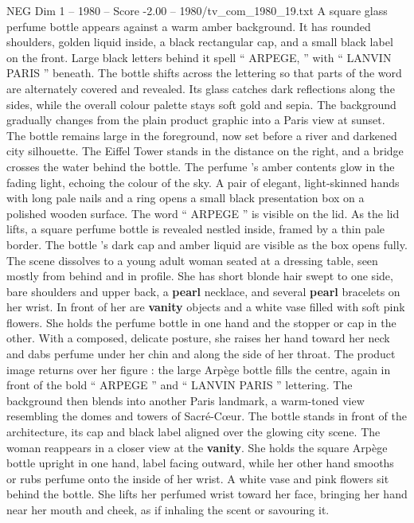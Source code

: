 \begin{textsample}{NEG Dim 1 – 1980 – Score -2.00 – 1980/tv\_com\_1980\_19.txt}  \label{ex:f1_neg_045}
A square glass perfume bottle appears against a warm amber background.
It has rounded shoulders, golden liquid inside, a black rectangular cap, and a small black label on the front.
Large black letters behind it spell “ ARPEGE, ” with “ LANVIN PARIS ” beneath.
The bottle shifts across the lettering so that parts of the word are alternately covered and revealed.
Its glass catches dark reflections along the sides, while the overall colour palette stays soft gold and sepia.
The background gradually changes from the plain product graphic into a Paris view at sunset.
The bottle remains large in the foreground, now set before a river and darkened city silhouette.
The Eiffel Tower stands in the distance on the right, and a bridge crosses the water behind the bottle.
The perfume ’s amber contents glow in the fading light, echoing the colour of the sky.
A pair of elegant, light-skinned hands with long pale nails and a ring opens a small black presentation box on a polished wooden surface.
The word “ ARPEGE ” is visible on the lid.
As the lid lifts, a square perfume bottle is revealed nestled inside, framed by a thin pale border.
The bottle ’s dark cap and amber liquid are visible as the box opens fully.
The scene dissolves to a young adult woman seated at a dressing table, seen mostly from behind and in profile.
She has short blonde hair swept to one side, bare shoulders and upper back, a \textbf{pearl} necklace, and several \textbf{pearl} bracelets on her wrist.
In front of her are \textbf{vanity} objects and a white vase filled with soft pink flowers.
She holds the perfume bottle in one hand and the stopper or cap in the other.
With a composed, delicate posture, she raises her hand toward her neck and dabs perfume under her chin and along the side of her throat.
The product image returns over her figure : the large Arpège bottle fills the centre, again in front of the bold “ ARPEGE ” and “ LANVIN PARIS ” lettering.
The background then blends into another Paris landmark, a warm-toned view resembling the domes and towers of Sacré-Cœur.
The bottle stands in front of the architecture, its cap and black label aligned over the glowing city scene.
The woman reappears in a closer view at the \textbf{vanity}.
She holds the square Arpège bottle upright in one hand, label facing outward, while her other hand smooths or rubs perfume onto the inside of her wrist.
A white vase and pink flowers sit behind the bottle.
She lifts her perfumed wrist toward her face, bringing her hand near her mouth and cheek, as if inhaling the scent or savouring it.

\end{textsample}

